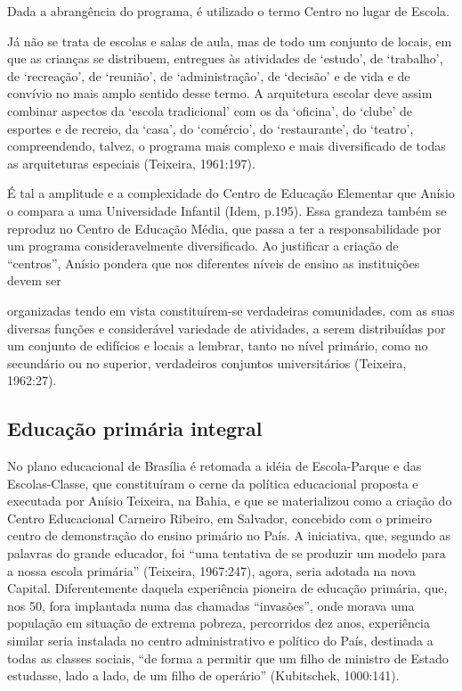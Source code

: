 Dada a abrangência do programa, é utilizado o termo Centro no lugar de Escola.
\begin{citacao}
    Já não se trata de escolas e salas de aula, mas de todo um conjunto de locais,
    em que as crianças se distribuem, entregues às atividades de ‘estudo’, de
    ‘trabalho’, de ‘recreação’, de ‘reunião’, de ‘administração’, de ‘decisão’ e de
    vida e de convívio no mais amplo sentido desse termo. A arquitetura escolar
    deve assim combinar aspectos da ‘escola tradicional’ com os da ‘oficina’,
    do ‘clube’ de esportes e de recreio, da ‘casa’, do ‘comércio’, do
    ‘restaurante’, do ‘teatro’, compreendendo, talvez, o programa mais
    complexo e mais diversificado de todas as arquiteturas especiais (Teixeira,
    1961:197).
\end{citacao}

É tal a amplitude e a complexidade do Centro de Educação Elementar que
Anísio o compara a uma Universidade Infantil (Idem, p.195). Essa grandeza também se
reproduz no Centro de Educação Média, que passa a ter a responsabilidade por um
programa consideravelmente diversificado. Ao justificar a criação de “centros”, Anísio
pondera que nos diferentes níveis de ensino as instituições devem ser
\begin{citacao}
    organizadas tendo em vista constituírem-se verdadeiras comunidades, com
    as suas diversas funções e considerável variedade de atividades, a serem
    distribuídas por um conjunto de edifícios e locais a lembrar, tanto no nível
    primário, como no secundário ou no superior, verdadeiros conjuntos
    universitários (Teixeira, 1962:27).
\end{citacao}

\subsection{Educação primária integral}

No plano educacional de Brasília é retomada a idéia de Escola-Parque e das
Escolas-Classe, que constituíram o cerne da política educacional proposta e executada
por Anísio Teixeira, na Bahia, e que se materializou como a criação do Centro
Educacional Carneiro Ribeiro, em Salvador, concebido com o primeiro centro de
demonstração do ensino primário no País. A iniciativa, que, segundo as palavras do
grande educador, foi “uma tentativa de se produzir um modelo para a nossa escola
primária” (Teixeira, 1967:247), agora, seria adotada na nova Capital. Diferentemente
daquela experiência pioneira de educação primária, que, nos 50, fora implantada numa
das chamadas “invasões”, onde morava uma população em situação de extrema
pobreza, percorridos dez anos, experiência similar seria instalada no centro
administrativo e político do País, destinada a todas as classes sociais, “de forma a
permitir que um filho de ministro de Estado estudasse, lado a lado, de um filho de
operário” (Kubitschek, 1000:141).

